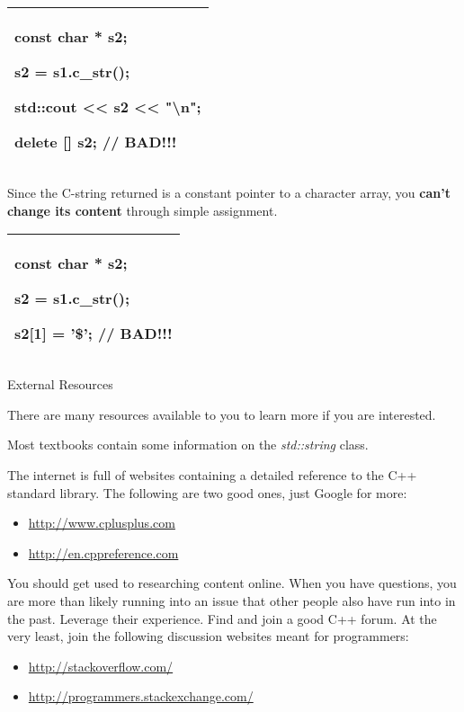 \documentclass[
]{article}
\providecommand{\tightlist}{%
  \setlength{\itemsep}{0pt}\setlength{\parskip}{0pt}}
\begin{document}
\begin{longtable}[]{@{}l@{}}
\toprule
\endhead
\begin{minipage}[t]{0.97\columnwidth}\raggedright
const char * s2;

s2 = s1.c\_str();

std::cout \textless\textless{} s2 \textless\textless{}
"\textbackslash n";

delete {[}{]} s2; // BAD!!!\strut
\end{minipage}\tabularnewline
\bottomrule
\end{longtable}

Since the C-string returned is a constant pointer to a character array,
you \textbf{can't change its content} through simple assignment.

\begin{longtable}[]{@{}l@{}}
\toprule
\endhead
\begin{minipage}[t]{0.97\columnwidth}\raggedright
const char * s2;

s2 = s1.c\_str();

s2{[}1{]} = '\$'; // BAD!!!\strut
\end{minipage}\tabularnewline
\bottomrule
\end{longtable}

External Resources

There are many resources available to you to learn more if you are
interested.

Most textbooks contain some information on the \emph{std::string} class.

The internet is full of websites containing a detailed reference to the
C++ standard library. The following are two good ones, just Google for
more:

\begin{itemize}
\tightlist
\item
  \href{http://www.cplusplus.com/}{http://www.cplusplus.com}
\item
  \href{http://en.cppreference.com/}{http://en.cppreference.com}
\end{itemize}

You should get used to researching content online. When you have
questions, you are more than likely running into an issue that other
people also have run into in the past. Leverage their experience. Find
and join a good C++ forum. At the very least, join the following
discussion websites meant for programmers:

\begin{itemize}
\tightlist
\item
  \url{http://stackoverflow.com/}
\item
  \url{http://programmers.stackexchange.com/}
\end{itemize}
\end{document}
